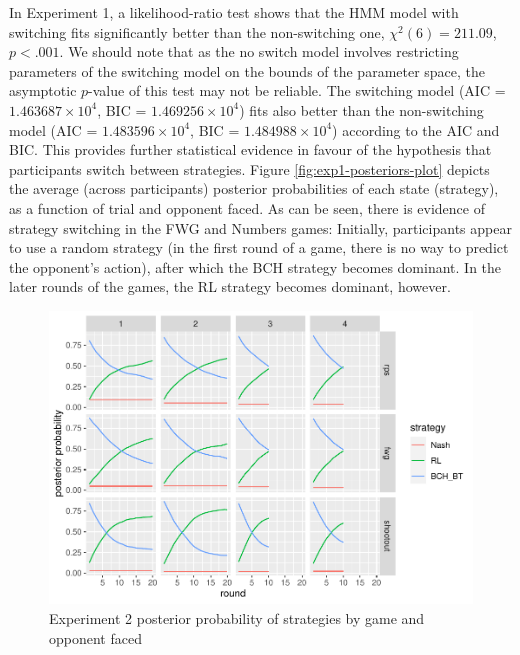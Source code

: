 \documentclass[smallextended]{svjour3}       %
\begin{document}
In Experiment 1, a likelihood-ratio test shows that the HMM model with
switching fits significantly better than the non-switching one,
\(\chi^2(6) = 211.09\), \(p < .001\). We should note that as the no
switch model involves restricting parameters of the switching model on
the bounds of the parameter space, the asymptotic \(p\)-value of this
test may not be reliable. The switching model (AIC =
\ensuremath{1.463687\times 10^{4}}, BIC =
\ensuremath{1.469256\times 10^{4}}) fits also better than the
non-switching model (AIC = \ensuremath{1.483596\times 10^{4}}, BIC =
\ensuremath{1.484988\times 10^{4}}) according to the AIC and BIC. This
provides further statistical evidence in favour of the hypothesis that
participants switch between strategies. Figure
\ref{fig:exp1-posteriors-plot} depicts the average (across participants)
posterior probabilities of each state (strategy), as a function of trial
and opponent faced. As can be seen, there is evidence of strategy
switching in the FWG and Numbers games: Initially, participants appear
to use a random strategy (in the first round of a game, there is no way
to predict the opponent's action), after which the BCH strategy becomes
dominant. In the later rounds of the games, the RL strategy becomes
dominant, however.

\begin{figure}

{\centering \includegraphics[width=\textwidth]{CBB_v2_files/figure-latex/exp2-posteriors-plot-1} 

}

\caption{Experiment 2 posterior probability of strategies by game and opponent faced}\label{fig:exp2-posteriors-plot}
\end{figure}
\end{document}
